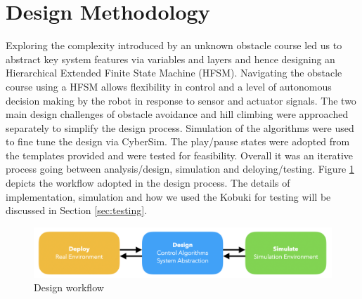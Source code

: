 \section{Design Methodology}\label{sec:design}
\vspace{-0.2cm} Exploring the complexity introduced by an unknown obstacle course led us to abstract key system features via variables and layers and hence designing an Hierarchical Extended Finite State Machine (HFSM). Navigating the obstacle course using a HFSM allows flexibility in control and a level of autonomous decision making by the robot in response to sensor and actuator signals. The two main design challenges of obstacle avoidance and hill climbing were approached separately to simplify the design process. Simulation of the algorithms were used to fine tune the design via CyberSim. The play/pause states were adopted from the templates provided and were tested for feasibility. Overall it was an iterative process going between analysis/design, simulation and deloying/testing. Figure \ref{fig:workflow} depicts the workflow adopted in the design process. The details of implementation, simulation and how we used the Kobuki for testing will be discussed in Section \ref{sec:testing}.
\begin{figure}[H]
    \centering
    \includegraphics[width=16cm]{Images/Workflow.png}
    \caption{Design workflow \cite[p.~36]{labguide}}
    \label{fig:workflow}
\end{figure}

\clearpage
